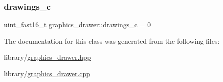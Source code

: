 \subsubsection{\texorpdfstring{drawings\+\_\+c}{drawings\_c}}
{\footnotesize\ttfamily uint\+\_\+fast16\+\_\+t graphics\+\_\+drawer\+::drawings\+\_\+c = 0\hspace{0.3cm}{\ttfamily [protected]}}



The documentation for this class was generated from the following files\+:\begin{DoxyCompactItemize}
\item 
library/\hyperlink{graphics__drawer_8hpp}{graphics\+\_\+drawer.\+hpp}\item 
library/\hyperlink{graphics__drawer_8cpp}{graphics\+\_\+drawer.\+cpp}\end{DoxyCompactItemize}
